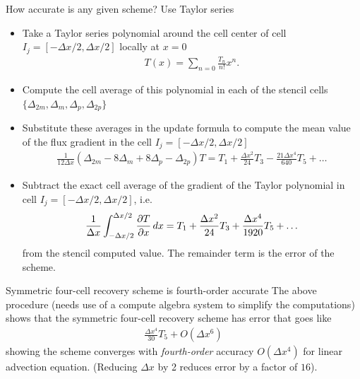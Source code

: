 \documentclass[aspectratio=169]{beamer}
\newcommand{\mypause}{\pause}
\newcommand{\pfrac}[2]{\frac{\partial #1}{\partial #2}}
\newcommand{\cramplist}{
	\setlength{\itemsep}{0in}
	\setlength{\partopsep}{0in}
	\setlength{\topsep}{0in}}
\begin{document}
\begin{frame}{How accurate is any given scheme? Use Taylor series}
  \footnotesize%
  \begin{itemize}\cramplist
  \item Take a Taylor series polynomial around the cell center of cell
    $I_j = [-\Delta x/2, \Delta x/2]$ locally at $x=0$
    \begin{align*}
      T(x) = \sum_{n=0} \frac{T_n}{n!} x^n.
    \end{align*}
    \mypause%
  \item Compute the cell average of this polynomial in each of the
    stencil cells $\{\Delta_{2m}, \Delta_m, \Delta_p, \Delta_{2p} \}$
    \mypause%
  \item Substitute these averages in the update formula to compute the
    mean value of the flux gradient in the cell
    $I_j = [-\Delta x/2, \Delta x/2]$
    \begin{align*}
      \frac{1}{12 \Delta x} (\Delta_{2m} - 8\Delta_m + 8 \Delta_p -
      \Delta_{2p}) T
      =
      T_1 + \frac{\Delta x^2}{24} T_3  - \frac{21 \Delta x^4}{640} T_5 + \ldots
    \end{align*}
    \mypause%
  \item Subtract the exact cell average of the gradient of the Taylor
    polynomial in cell $I_j = [-\Delta x/2, \Delta x/2]$, i.e.
    \begin{align*}
      \frac{1}{\Delta x}\int_{-\Delta x/2}^{\Delta x/2} \pfrac{T}{x} \thinspace dx
      =
      T_1 + \frac{\Delta x^2}{24} T_3  + \frac{\Delta x^4}{1920} T_5 + \ldots
    \end{align*}
    from the stencil computed value. The remainder term is the error
    of the scheme.
  \end{itemize}  
\end{frame}

\begin{frame}{Symmetric four-cell recovery scheme is fourth-order
    accurate}
  The above procedure (needs use of a compute algebra system to
  simplify the computations) shows that the symmetric four-cell
  recovery scheme has error that goes like
  \begin{align*}
      \frac{\Delta x^4}{30} T_5 + O(\Delta x^6)
  \end{align*}
  showing the scheme converges with \emph{fourth-order} accuracy
  $O(\Delta x^4)$ for linear advection equation. (Reducing $\Delta x$
  by 2 reduces error by a factor of $16$).

\end{frame}
\end{document}
